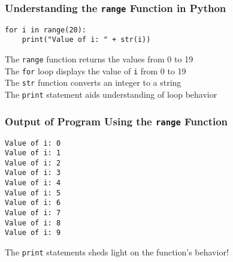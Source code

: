 \documentclass[14pt,aspectratio=169]{beamer}
\begin{document}
%
\begin{frame}[fragile]
  \frametitle{Understanding the {\tt range} Function in Python}
  \normalsize
  \begin{minipage}{6in}
    \vspace*{.25in}
    \begin{verbatim}
for i in range(20):
    print("Value of i: " + str(i))
    \end{verbatim}
  \end{minipage}
  \vspace*{.25in}
  \begin{center}
    \normalsize \noindent The {\tt range} function returns the values from 0 to 19 \\
    \normalsize \noindent The {\tt for} loop displays the value of {\tt i} from 0 to 19 \\
    \normalsize \noindent The {\tt str} function converts an integer to a string \\
    \normalsize \noindent The {\tt print} statement aids understanding of
    loop behavior \\
  \end{center}
\end{frame}

%
\begin{frame}[fragile]
  \frametitle{Output of Program Using the {\tt range} Function}
  \normalsize
  \begin{minipage}{6in}
    \vspace*{.25in}
    \begin{verbatim}
Value of i: 0
Value of i: 1
Value of i: 2
Value of i: 3
Value of i: 4
Value of i: 5
Value of i: 6
Value of i: 7
Value of i: 8
Value of i: 9
    \end{verbatim}
  \end{minipage}
  \vspace*{.05in}
  \begin{center}
    \normalsize \noindent The {\tt print} statements sheds light on the
  function's behavior!\\
  \end{center}
\end{frame}
\end{document}

